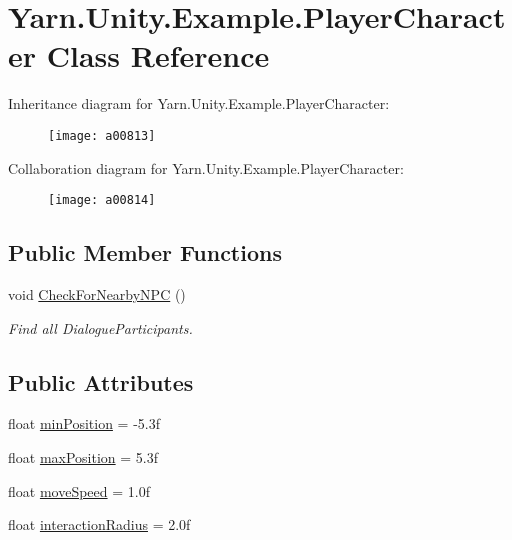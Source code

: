 \hypertarget{a00152}{\section{Yarn.\-Unity.\-Example.\-Player\-Character Class Reference}
\label{a00152}
}


Inheritance diagram for Yarn.\-Unity.\-Example.\-Player\-Character\-:
\nopagebreak
\begin{figure}[H]
\begin{center}
\leavevmode
\texttt{[image: a00813]}
\end{center}
\end{figure}


Collaboration diagram for Yarn.\-Unity.\-Example.\-Player\-Character\-:
\nopagebreak
\begin{figure}[H]
\begin{center}
\leavevmode
\texttt{[image: a00814]}
\end{center}
\end{figure}
\subsection*{Public Member Functions}
\begin{DoxyCompactItemize}
\item 
void \hyperlink{a00152_a574b6d984b8671c7a780d3d10e040a9b}{Check\-For\-Nearby\-N\-P\-C} ()
\begin{DoxyCompactList}\small\item\em Find all Dialogue\-Participants. \end{DoxyCompactList}\end{DoxyCompactItemize}
\subsection*{Public Attributes}
\begin{DoxyCompactItemize}
\item 
float \hyperlink{a00152_ac025d4f4afaf854f8256e0d2d03e5b52}{min\-Position} = -\/5.\-3f
\item 
float \hyperlink{a00152_ada9dd748a1d89a7f9b12ac8967a07ae6}{max\-Position} = 5.\-3f
\item 
float \hyperlink{a00152_adc602a4b2c7e44e4b15a11f1ffcf07e4}{move\-Speed} = 1.\-0f
\item 
float \hyperlink{a00152_af89807d2195915ee9a0c42317e110fc6}{interaction\-Radius} = 2.\-0f
\end{DoxyCompactItemize}
